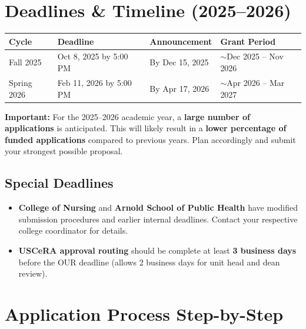 \documentclass[11pt, letterpaper]{article}
\newcommand{\warnbox}[1]{%
\begin{tcolorbox}[colback=Black10, colframe=Rose]
\textbf{Important:} #1
\end{tcolorbox}
}
\begin{document}
\section{Deadlines \& Timeline (2025--2026)}

\begin{center}
\begin{tabularx}{\textwidth}{@{}l l l X@{}}
\toprule
\textbf{Cycle} & \textbf{Deadline} & \textbf{Announcement} & \textbf{Grant Period} \\
\midrule
Fall 2025 & Oct 8, 2025 by 5:00 PM & By Dec 15, 2025 & $\sim$Dec 2025 -- Nov 2026 \\
Spring 2026 & Feb 11, 2026 by 5:00 PM & By Apr 17, 2026 & $\sim$Apr 2026 -- Mar 2027 \\
\bottomrule
\end{tabularx}
\end{center}

\warnbox{For the 2025--2026 academic year, a \textbf{large number of applications} is anticipated. This will likely result in a \textbf{lower percentage of funded applications} compared to previous years. Plan accordingly and submit your strongest possible proposal.}

\subsection{Special Deadlines}

\begin{itemize}[nosep]
    \item \textbf{College of Nursing} and \textbf{Arnold School of Public Health} have modified submission procedures and earlier internal deadlines. Contact your respective college coordinator for details.
    \item \textbf{USCeRA approval routing} should be complete at least \textbf{3 business days} before the OUR deadline (allows 2 business days for unit head and dean review).
\end{itemize}

\section{Application Process Step-by-Step}
\end{document}
